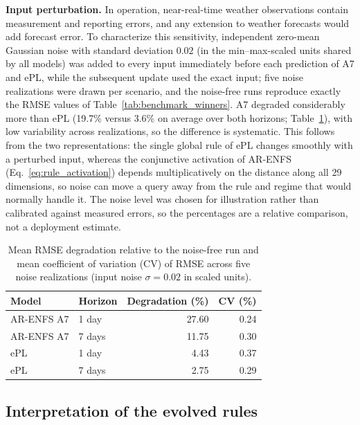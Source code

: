 \documentclass[preprint,12pt]{elsarticle}
\begin{document}
\textbf{Input perturbation.} In operation, near-real-time weather observations contain measurement and reporting errors, and any extension to weather forecasts would add forecast error. To characterize this sensitivity, independent zero-mean Gaussian noise with standard deviation $0.02$ (in the min--max-scaled units shared by all models) was added to every input immediately before each prediction of A7 and ePL, while the subsequent update used the exact input; five noise realizations were drawn per scenario, and the noise-free runs reproduce exactly the RMSE values of Table~\ref{tab:benchmark_winners}. A7 degraded considerably more than ePL (19.7\% versus 3.6\% on average over both horizons; Table~\ref{tab:perturbation_robustness}), with low variability across realizations, so the difference is systematic. This follows from the two representations: the single global rule of ePL changes smoothly with a perturbed input, whereas the conjunctive activation of AR-ENFS (Eq.~\eqref{eq:rule_activation}) depends multiplicatively on the distance along all 29 dimensions, so noise can move a query away from the rule and regime that would normally handle it. The noise level was chosen for illustration rather than calibrated against measured errors, so the percentages are a relative comparison, not a deployment estimate.

\begin{table}[!t]
\caption{Mean RMSE degradation relative to the noise-free run and mean coefficient of variation (CV) of RMSE across five noise realizations (input noise $\sigma=0.02$ in scaled units).}
\label{tab:perturbation_robustness}
\centering
\small
\begin{tabular}{llrr}
\toprule
\textbf{Model} & \textbf{Horizon} & \textbf{Degradation (\%)} & \textbf{CV (\%)} \\
\midrule
AR-ENFS A7 & 1 day & 27.60 & 0.24 \\
AR-ENFS A7 & 7 days & 11.75 & 0.30 \\
ePL & 1 day & 4.43 & 0.37 \\
ePL & 7 days & 2.75 & 0.29 \\
\bottomrule
\end{tabular}
\end{table}

\subsection{Interpretation of the evolved rules}
\label{subsubsec:rule_interpretability}
\end{document}
